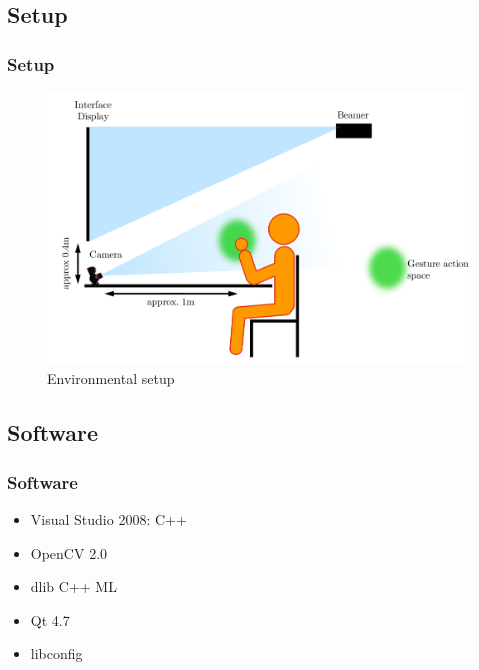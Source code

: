 \documentclass{beamer}
\begin{document}
	\subsection*{Setup}
	\begin{frame}
		\frametitle{Setup}
		\begin{figure}
			\includegraphics[scale=0.3]{images/setup} 
			\caption{Environmental setup}
		\end{figure}
	\end{frame}
	
	\subsection*{Software}
	\begin{frame}
		\frametitle{Software}
		\begin{itemize}
			\item Visual Studio 2008: C++
			\item OpenCV 2.0
			\item dlib C++ ML
			\item Qt 4.7
			\item libconfig
		\end{itemize}
	\end{frame}
\end{document}
